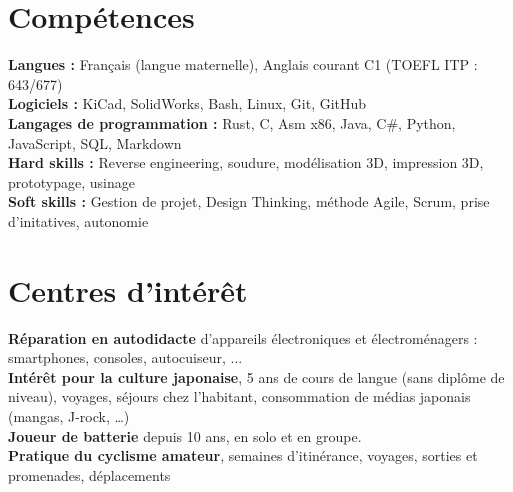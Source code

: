 \documentclass[letterpaper,11pt]{article}
\begin{document}
\section{Compétences}
 \begin{itemize}[leftmargin=0.15in, label={}]
    \small{\item{
     \textbf{Langues :}{ Français (langue maternelle), Anglais courant C1 (TOEFL ITP : 643/677)} \\
     \textbf{Logiciels :}{ KiCad, SolidWorks, Bash, Linux, Git, GitHub} \\
     \textbf{Langages de programmation :}{ Rust, C, Asm x86, Java, C\#, Python, JavaScript, SQL, Markdown} \\
     \textbf{Hard skills :}{ Reverse engineering, soudure, modélisation 3D, impression 3D, prototypage, usinage} \\
     \textbf{Soft skills :}{ Gestion de projet, Design Thinking, méthode Agile, Scrum, prise d’initatives, autonomie}
    }}
 \end{itemize}

\section{Centres d'intérêt}
 \begin{itemize}[leftmargin=0.15in, label={}]
    \small{\item{
     \textbf{Réparation en autodidacte }{d’appareils électroniques et électroménagers : smartphones, consoles, autocuiseur, ...} \\
     \textbf{Intérêt pour la culture japonaise}{, 5 ans de cours de langue (sans diplôme de niveau), voyages, séjours chez l’habitant, consommation de médias japonais (mangas, J-rock, …)} \\
     \textbf{Joueur de batterie }{depuis 10 ans, en solo et en groupe.} \\
     \textbf{Pratique du cyclisme amateur}{, semaines d’itinérance, voyages, sorties et promenades, déplacements}
    }}
 \end{itemize}
\end{document}
